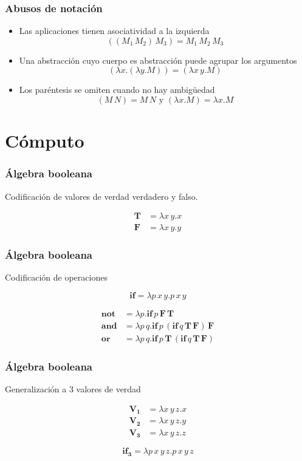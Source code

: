 \documentclass[pdf]{beamer}
\newcommand{\bs}{\boldsymbol}
\begin{document}
\begin{frame}
  \frametitle{Abusos de notación}

  \begin{itemize}
  \item<2-> \alert<2>{Las aplicaciones tienen asociatividad a la izquierda}
    \[ ((M_{1}\, M_{2})\, M_{3}) = M_{1}\, M_{2}\, M_{3} \]
  \item<3-> \alert<3>{Una abstracción cuyo cuerpo es abstracción puede agrupar los argumentos}
    \[ (λx.(λy.M)) = (λx\, y.M) \]
  \item<4-> \alert<4>{Los paréntesis se omiten cuando no hay ambigüedad}
    \[ (M\, N) = M\, N \text{ y } (λx.M) = λx.M \]
  \end{itemize}
\end{frame}

\section{Cómputo}

\begin{frame}
  \frametitle{Álgebra booleana}
  Codificación de valores de verdad \alert{verdadero} y \alert{falso}.

  \begin{align*}
    \bs{T} &= λx\, y.x \\
    \bs{F} &= λx\, y.y
  \end{align*}
  
\end{frame}

\begin{frame}
  \frametitle{Álgebra booleana}
  Codificación de operaciones

  \[ \bs{if} = λp\, x\, y.p\, x\, y \]

  \begin{align*}
    \bs{not} &= λp.\bs{if}\, p\, \bs{F}\, \bs{T} \\
    \bs{and} &= λp\, q.\bs{if}\, p\, (\bs{if}\, q\, \bs{T}\, \bs{F})\, \bs{F} \\
    \bs{or} &= λp\, q.\bs{if}\, p\, \bs{T}\, (\bs{if}\, q\, \bs{T}\, \bs{F})
  \end{align*}
  
\end{frame}

\begin{frame}
  \frametitle{Álgebra booleana}
  Generalización a \( 3 \) valores de verdad

  \begin{align*}
    \bs{V_{1}} &= λx\, y\, z.x \\
    \bs{V_{2}} &= λx\, y\, z.y \\
    \bs{V_{3}} &= λx\, y\, z.z
  \end{align*}

  \[ \bs{if_{3}} = λp\, x\, y\, z.p\, x\, y\, z \]
  
\end{frame}
\end{document}
